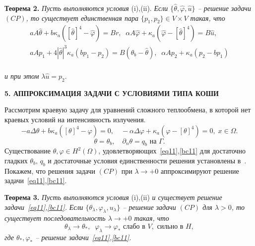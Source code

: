 \documentclass[12pt]{article}
\begin{document}
    \textbf{Теорема 2.}
    {\it Пусть выполняются условия} (i),(ii).
    {\it Если $\{\hat{\theta}, \hat{\varphi}, \hat{u}\}$ -- решение
    задачи $(CP)$, то существует единственная пара $\{p_1, p_2 \} \in V\times V$
        такая, что}
    \begin{gather*}
        aA\hat{\theta} + b \kappa_a([\hat{\theta}]^4 -\hat{\varphi}) = Br, \;\;
        \alpha A \hat{\varphi} + \kappa_a(\hat{\varphi} - [\hat{\theta}]^4) = B\hat{u},\\
        aAp_1 +4|\hat{\theta}|^3 \kappa_a(bp_1 - p_2) = B(\theta_b - \hat{\theta}), \;\;
        \alpha A p_2 + \kappa_a (p_2 - b p_1)\\
    \end{gather*}

    {\it и при этом} $\lambda\hat{u} = p_2.$




    \begin{center}
        \textbf{5. АППРОКСИМАЦИЯ ЗАДАЧИ С УСЛОВИЯМИ ТИПА КОШИ}
    \end{center}


    Рассмотрим краевую задачу для уравнений сложного теплообмена, в которой нет краевых условий на
    интенсивность излучения.
    \begin{equation}
        \label{eq11}  - a\Delta\theta + b\kappa_a([\theta]^4- \varphi)=0,\quad
        -\alpha \Delta \varphi +
        \kappa_a(\varphi-[\theta]^4)=0,\; x\in\Omega.
    \end{equation}
    \begin{equation}
        \label{bc11} \theta=\theta_b,\quad \partial_n\theta = q_b \text{  на  }\Gamma.
    \end{equation}
    Существование $\theta,\varphi\in H^2(\Omega)$, удовлетворяющих~\eqref{eq11},\eqref{bc11}
    для достаточно гладких
    $\theta_b,\, q_b$ и достаточные условия единственности решения
    установлены в~\cite{CMMP20}.
    Покажем, что решения задачи $(CP)$ при $\lambda\to+0$
    аппроксимируют решение задачи~\eqref{eq11},\eqref{bc11}.


    \textbf{Теорема 3.}
    {\it
        Пусть выполняются условия} (i),(ii) {\it и существует решение задачи~\eqref{eq11},\eqref{bc11}.}
    {\it  Если $\{\theta_\lambda,\varphi_\lambda,u_\lambda\}$ -- решение
    задачи $(CP)$ для $\lambda>0$, то существует последовательность
        $\lambda\to +0$
        такая, что}
    \[
        \theta_\lambda\rightarrow\theta_*, \;\; \varphi_\lambda\rightarrow\varphi_*
        \text{ слабо в }V,\text{ сильно в }H,
    \]
    {\it где $\theta_*,\varphi_*$ -- решение задачи~\eqref{eq11},\eqref{bc11}.}
\end{document}
